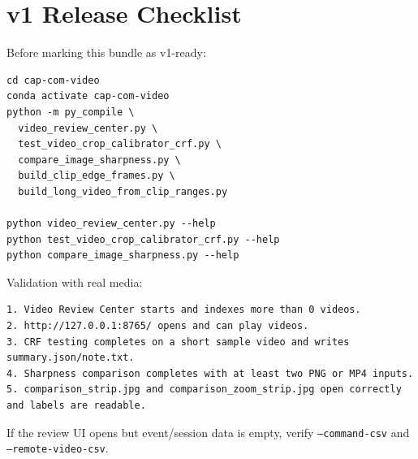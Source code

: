 \documentclass[11pt,a4paper]{article}
\begin{document}
\section{v1 Release Checklist}
Before marking this bundle as v1-ready:
\begin{verbatim}
cd cap-com-video
conda activate cap-com-video
python -m py_compile \
  video_review_center.py \
  test_video_crop_calibrator_crf.py \
  compare_image_sharpness.py \
  build_clip_edge_frames.py \
  build_long_video_from_clip_ranges.py

python video_review_center.py --help
python test_video_crop_calibrator_crf.py --help
python compare_image_sharpness.py --help
\end{verbatim}
Validation with real media:
\begin{verbatim}
1. Video Review Center starts and indexes more than 0 videos.
2. http://127.0.0.1:8765/ opens and can play videos.
3. CRF testing completes on a short sample video and writes summary.json/note.txt.
4. Sharpness comparison completes with at least two PNG or MP4 inputs.
5. comparison_strip.jpg and comparison_zoom_strip.jpg open correctly and labels are readable.
\end{verbatim}
If the review UI opens but event/session data is empty, verify \texttt{--command-csv} and \texttt{--remote-video-csv}.
\end{document}
